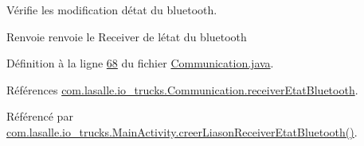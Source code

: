 Vérifie les modification d\textquotesingle{}état du bluetooth. 

\begin{DoxyReturn}{Renvoie}
renvoie le Receiver de l\textquotesingle{}état du bluetooth 
\end{DoxyReturn}


Définition à la ligne \hyperlink{_communication_8java_source_l00068}{68} du fichier \hyperlink{_communication_8java_source}{Communication.\+java}.



Références \hyperlink{_communication_8java_source_l00034}{com.\+lasalle.\+io\+\_\+trucks.\+Communication.\+receiver\+Etat\+Bluetooth}.



Référencé par \hyperlink{_main_activity_8java_source_l00287}{com.\+lasalle.\+io\+\_\+trucks.\+Main\+Activity.\+creer\+Liason\+Receiver\+Etat\+Bluetooth()}.


